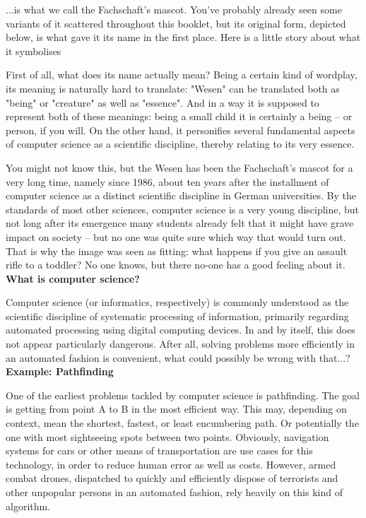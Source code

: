 {...is what we call the Fachschaft's mascot. You've probably already seen some variants of it scattered throughout this booklet, but its original form, depicted below, is what gave it its name in the first place. Here is a little story about what it symbolises}
{

    First of all, what does its name actually mean? Being a certain kind of wordplay, its meaning is naturally hard to translate: "Wesen" can be translated both as "being" or "creature" as well as "essence".
    And in a way it is supposed to represent both of these meanings: being a small child it is certainly a being -- or person, if you will.
    On the other hand, it personifies several fundamental aspects of computer science as a scientific discipline, thereby relating to its very essence.

    You might not know this, but the Wesen has been the Fachschaft's mascot for a very long time, namely since 1986, about ten years after the installment of computer science as a distinct scientific discipline in German universities.
    By the standards of most other sciences, computer science is a very young discipline, but not long after its emergence many students already felt that it might have grave impact on society -- but no one was quite sure which way that would turn out.
    That is why the image was seen as fitting: what happens if you give an assault rifle to a toddler? No one knows, but there no-one has a good feeling about it.\\

    \textbf{What is computer science?}

    Computer science (or informatics, respectively) is commonly understood as the scientific discipline of systematic processing of information, primarily regarding automated processing using digital computing devices.
    In and by itself, this does not appear particularly dangerous. After all, solving problems more efficiently in an automated fashion is convenient, what could possibly be wrong with that...?\\

    \textbf{Example: Pathfinding}

    One of the earliest problems tackled by computer science is pathfinding. The goal is getting from point A to B in the most efficient way.
    This may, depending on context, mean the shortest, fastest, or least encumbering path. Or potentially the one with most sightseeing spots between two points.
    Obviously, navigation systems for cars or other means of transportation are use cases for this technology, in order to reduce human error as well as costs.
    However, armed combat drones, dispatched to quickly and efficiently dispose of terrorists and other unpopular persons in an automated fashion, rely heavily on this kind of algorithm.\\

}
